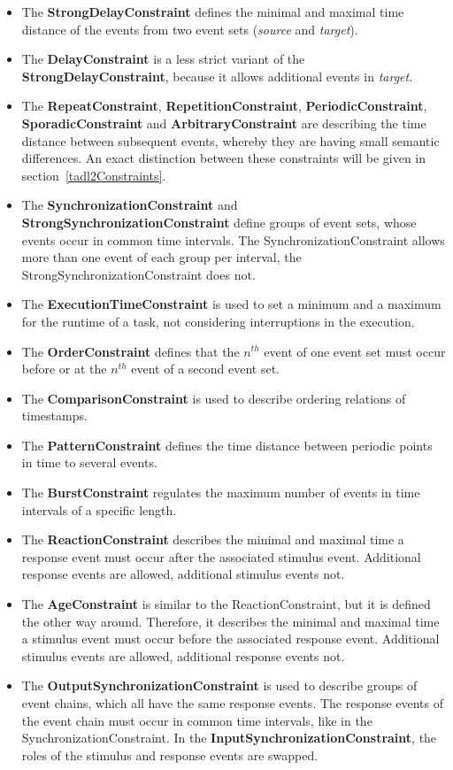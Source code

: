 	\begin{itemize}
		\item
			The \textbf{StrongDelayConstraint} defines the minimal and maximal time distance of the events from two event sets (\emph{source} and \emph{target}).
		\item
			The \textbf{DelayConstraint} is a less strict variant of the \textbf{StrongDelayConstraint}, because it allows additional events in \emph{target}.
		\item
			The \textbf{RepeatConstraint}, \textbf{RepetitionConstraint}, \textbf{PeriodicConstraint}, \textbf{SporadicConstraint} and \textbf{ArbitraryConstraint} are describing the time distance between subsequent events, whereby they are having small semantic differences. An exact distinction between these constraints will be given in section~\ref{tadl2Constraints}.
		\item
			The \textbf{SynchronizationConstraint} and \textbf{StrongSynchronizationConstraint} define groups of event sets, whose events occur in common time intervals. The SynchronizationConstraint allows more than one event of each group per interval, the StrongSynchronizationConstraint does not.
		\item
			The \textbf{ExecutionTimeConstraint} is used to set a minimum and a maximum for the runtime of a task, not considering interruptions in the execution.
		\item
			The \textbf{OrderConstraint} defines that the $n^{th}$ event of one event set must occur before or at the $n^{th}$ event of a second event set.
		\item
			The \textbf{ComparisonConstraint} is used to describe ordering relations of timestamps.
		\item
			The \textbf{PatternConstraint} defines the time distance between periodic points in time to several events.
		\item
			The \textbf{BurstConstraint} regulates the maximum number of events in time intervals of a specific length.
		\item
			The \textbf{ReactionConstraint} describes the minimal and maximal time a response event must occur after the associated stimulus event. Additional response events are allowed, additional stimulus events not.
		\item
			The \textbf{AgeConstraint} is similar to the ReactionConstraint, but it is defined the other way around. Therefore, it describes the minimal and maximal time a stimulus event must occur before the associated response event.  Additional stimulus events are allowed, additional response events not.
		\item
			The \textbf{OutputSynchronizationConstraint} is used to describe groups of event chains, which all have the same response events. The response events of the event chain must occur in common time intervals, like in the SynchronizationConstraint. In the \textbf{InputSynchronizationConstraint}, the roles of the stimulus and response events are swapped.			
	\end{itemize}
	
